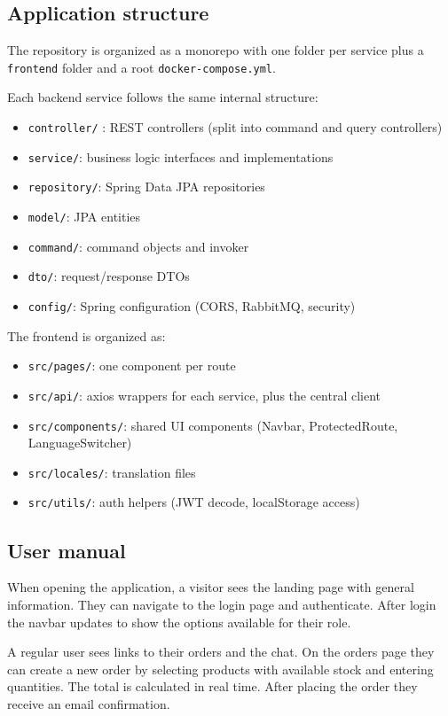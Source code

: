 \documentclass[12pt, a4paper]{article}
\begin{document}
\subsection{Application structure}

The repository is organized as a monorepo with one folder per service plus a \texttt{frontend}
folder and a root \texttt{docker-compose.yml}.

Each backend service follows the same internal structure:
\begin{itemize}
    \item \texttt{controller/} : REST controllers (split into command and query controllers)
    \item \texttt{service/}: business logic interfaces and implementations
    \item \texttt{repository/}: Spring Data JPA repositories
    \item \texttt{model/}: JPA entities
    \item \texttt{command/}: command objects and invoker
    \item \texttt{dto/}: request/response DTOs
    \item \texttt{config/}: Spring configuration (CORS, RabbitMQ, security)
\end{itemize}

The frontend is organized as:
\begin{itemize}
    \item \texttt{src/pages/}: one component per route
    \item \texttt{src/api/}: axios wrappers for each service, plus the central client
    \item \texttt{src/components/}: shared UI components (Navbar, ProtectedRoute, LanguageSwitcher)
    \item \texttt{src/locales/}: translation files
    \item \texttt{src/utils/}: auth helpers (JWT decode, localStorage access)
\end{itemize}

\subsection{User manual}

When opening the application, a visitor sees the landing page with general information.
They can navigate to the login page and authenticate. After login the navbar updates to show
the options available for their role.

A regular user sees links to their orders and the chat. On the orders page they can
create a new order by selecting products with available stock and entering quantities. The
total is calculated in real time. After placing the order they receive an email confirmation.
\end{document}
